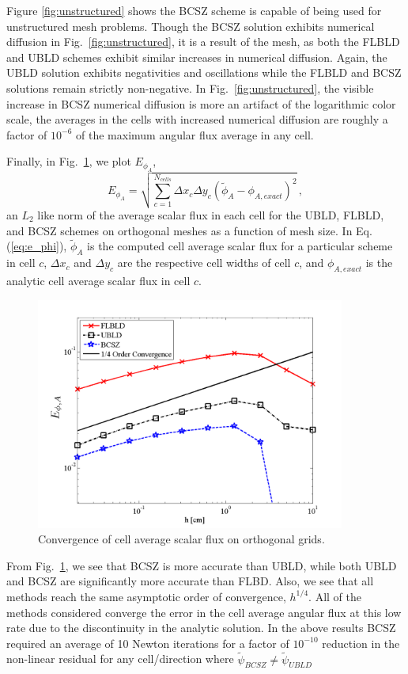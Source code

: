 \documentclass{mc2015}
\newcommand{\fig}[1]{Fig.~\ref{#1}}                      %
\newcommand{\benum}{\begin{equation}} 			%
\newcommand{\eenum}{\end{equation}}
\newcommand{\eqt}[1]{Eq. (\ref{#1})}  %
\newcommand{\BCSZ}{\ensuremath{\widetilde{\psi}_{BCSZ}}}
\newcommand{\pec}{\, ,}
\begin{document}
Figure \ref{fig:unstructured} shows the BCSZ scheme is capable of being used for unstructured mesh problems.
Though the BCSZ solution exhibits numerical diffusion in \fig{fig:unstructured}, it is a result of the mesh, as both the FLBLD and UBLD schemes exhibit similar increases in numerical diffusion.  Again, the UBLD solution exhibits negativities and oscillations while the FLBLD and BCSZ solutions remain strictly non-negative.  In \fig{fig:unstructured}, the visible increase in BCSZ numerical diffusion is more an artifact of the logarithmic color scale, the averages in the cells with increased numerical diffusion are roughly a factor of $10^{-6}$ of the maximum angular flux average in any cell. 

Finally, in \fig{fig:convergence}, we plot $E_{\phi_A}$,
\benum
\label{eq:e_phi}
E_{\phi_A} = \sqrt{ \sum_{c=1}^{N_{cells}}{ \Delta x_c \Delta y_c (\widetilde{\phi}_A - \phi_{A,exact} )^2} } \pec
\eenum
an $L_2$ like norm of the average scalar flux in each cell for the UBLD, FLBLD, and BCSZ schemes on orthogonal meshes as a function of mesh size.  
In \eqt{eq:e_phi}, $\widetilde{\phi}_A$ is the computed cell average scalar flux for a particular scheme in cell $c$, $\Delta x_c$ and $\Delta y_c$ are the respective cell widths of cell $c$, and $\phi_{A,exact}$ is the analytic cell average scalar flux in cell $c$.
\begin{figure}[h]
\centering
\includegraphics[width=4in]{glance_convergence}
\caption{Convergence of cell average scalar flux on orthogonal grids.}
\label{fig:convergence}
\end{figure}
From \fig{fig:convergence}, we see that BCSZ is more accurate than UBLD, while both UBLD and BCSZ are significantly more accurate than FLBD.
Also, we see that all methods reach the same asymptotic order of convergence, $h^{1/4}$.
All of the methods considered converge the error in the cell average angular flux at this low rate due to the discontinuity in the analytic solution.
In the above results BCSZ required an average of 10 Newton iterations for a factor of $10^{-10}$ reduction in the non-linear residual for any cell/direction where $\BCSZ \neq \widetilde{\psi}_{UBLD}$ 
\end{document}
